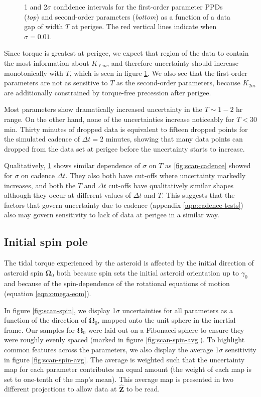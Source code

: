 \documentclass[fleqn,usenatbib]{mnras}
\newcommand{\unit}[1]{\bm{\hat{#1}}}
\begin{document}
\begin{figure}
  \caption{1 and 2$\sigma$ confidence intervals for the first-order parameter PPDs (\textit{top}) and second-order parameters (\textit{bottom}) as a function of a data gap of width $T$ at perigee. The red vertical lines indicate when $\sigma = 0.01$.}
  \label{fig:observation-gap}
\end{figure}

Since torque is greatest at perigee, we expect that region of the data to contain the most information about $K_{\ell m}$, and therefore uncertainty should increase monotonically with $T$, which is seen in figure \ref{fig:observation-gap}. We also see that the first-order parameters are not as sensitive to $T$ as the second-order parameters, because $K_{2m}$ are additionally constrained by torque-free precession after perigee.

Most parameters show dramatically increased uncertainty in the $T \sim 1-2$ hr range. On the other hand, none of the uncertainties increase noticeably for $T < 30$ min. Thirty minutes of dropped data is equivalent to fifteen dropped points for the simulated cadence of $\Delta t = 2$ minutes, showing that many data points can dropped from the data set at perigee before the uncertainty starts to increase.

Qualitatively, \ref{fig:observation-gap} shows similar dependence of $\sigma$ on $T$ as \ref{fig:scan-cadence} showed for $\sigma$ on cadence $\Delta t$. They also both have cut-offs where uncertainty markedly increases, and both the $T$ and $\Delta t$ cut-offs have qualitatively similar shapes although they occur at different values of $\Delta t$ and $T$. This suggests that the factors that govern uncertainty due to cadence (appendix \ref{app:cadence-tests}) also may govern sensitivity to lack of data at perigee in a similar way.


\subsection{Initial spin pole}
\label{sec:scan-spin}

The tidal torque experienced by the asteroid is affected by the initial direction of asteroid spin $\bm \Omega_0$ both because spin sets the initial asteroid orientation up to $\gamma_0$ and because of the spin-dependence of the rotational equations of motion (equation \ref{eqn:omega-eom}).

In figure \ref{fig:scan-spin}, we display 1$\sigma$ uncertainties for all parameters as a function of the direction of $\bm \Omega_0$, mapped onto the unit sphere in the inertial frame. Our samples for $\bm \Omega_0$ were laid out on a Fibonacci sphere to ensure they were roughly evenly spaced (marked in figure \ref{fig:scan-spin-avg}). To highlight common features across the parameters, we also display the average 1$\sigma$ sensitivity in figure \ref{fig:scan-spin-avg}. The average is weighted such that the uncertainty map for each parameter contributes an equal amount
(the weight of each map is set to one-tenth of the map's mean). This average map is presented in two different projections to allow data at $\unit Z$ to be read.
\end{document}
